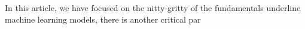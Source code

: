 In this article, we have focused on the nitty-gritty of the fundamentals underline machine learning models, there is another critical par